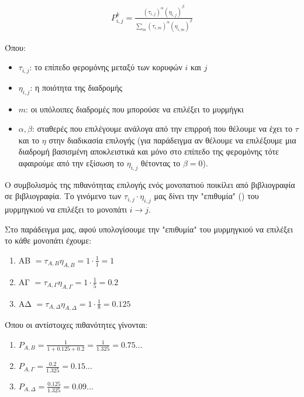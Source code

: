 \begin{align} \label{eq:3}
	P^k_{i,j}=\frac{(τ_{i,j})^\alpha(η_{i,j})^\beta}{\sum_{m}(τ_{i,m})^\alpha(η_{i,m})^\beta}
\end{align}

Όπου: 
\begin{itemize}
    \item $\tau_{i,j}$: το επίπεδο φερομόνης μεταξύ των κορυφών $i$ και $j$
    \item $\eta_{i,j}$: η ποιότητα της διαδρομής
    \item $m$: οι υπόλοιπες διαδρομές που μπορούσε να επιλέξει το μυρμήγκι
    \item $\alpha, \beta$: σταθερές που επιλέγουμε ανάλογα από την επιρροή που θέλουμε να έχει το $\tau$ και το $\eta$ στην διαδικασία επιλογής (για παράδειγμα αν θέλουμε να επιλέξουμε μια διαδρομή βασισμένη αποκλειστικά και μόνο στο επίπεδο της φερομόνης τότε αφαιρούμε από την εξίσωση το $\eta_{i,j}$ θέτοντας το $\beta=0$).
\end{itemize}
Ο συμβολισμός της πιθανότητας επιλογής ενός μονοπατιού ποικίλει από βιβλιογραφία σε βιβλιογραφία. 
Το γινόμενο των $\tau_{i,j}\cdot\eta_{i,j}$ μας δίνει την "επιθυμία" () του μυρμηγκιού να επιλέξει το μονοπάτι $i \rightarrow j$.

Στο παράδειγμα μας, αφού υπολογίσουμε την "επιθυμία" του μυρμηγκιού να επιλέξει το κάθε μονοπάτι έχουμε:

\begin{enumerate}
    \item AΒ $= \tau_{A,B}\eta_{A,B}=1\cdot\frac{1}{1}=1$ 
    \item AΓ $= \tau_{A,Γ}\eta_{A,Γ}=1\cdot\frac{1}{5}=0.2$
    \item AΔ $= \tau_{A,Δ}\eta_{A,Δ}=1\cdot\frac{1}{8}=0.125$
\end{enumerate}

Όπου οι αντίστοιχες πιθανότητες γίνονται:

\begin{enumerate}
    \item $P_{A,B}=\frac{1}{1+0.125+0.2}=\frac{1}{1.325}=0.75...$
    \item $P_{A,Γ}=\frac{0.2}{1.325}=0.15...$
    \item $P_{A,Δ}=\frac{0.125}{1.325}=0.09...$
\end{enumerate}

